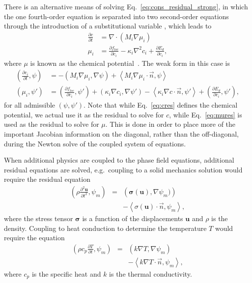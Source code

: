 \documentclass[letter,12pt,fleqn]{article}
\begin{document}
There is an alternative means of solving Eq.~\eqref{eq:cons_residual_strong}, in which the one fourth-order equation is separated into two second-order equations through the introduction of a substitutional variable \citep{Elliott1989}, which leads to
%
\begin{align}
  \nonumber
  \frac{\partial c}{\partial t} &=\nabla \cdot (M_i \nabla \mu_i) \\
  \label{split}
  \mu_i &=  \frac{\partial f_{loc}}{\partial c_i} - \kappa_i \nabla^2 c_i + \frac{\partial E_{d}}{\partial c_i},
\end{align}
%
where $\mu$ is known as the chemical potential~\citep{Elliott1989}. The weak form in this case is
%
\begin{align}
  \left(\frac{\partial c_i}{\partial t}, \psi\right) &=-(M_i\nabla\mu_i,\nabla\psi)+ \left\langle M_i\nabla\mu_i\cdot\vec{n},\psi \right\rangle \label{eq:mures}
  \\
  \left(\mu_i,\psi'\right) &= \left( \frac{\partial f_{loc}}{\partial c_i},\psi'\right) + \left( \kappa_i \nabla c_i,\nabla\psi'\right) - \left\langle  \kappa_i \nabla c \cdot\vec{n},\psi' \right\rangle +  \left( \frac{\partial E_d}{\partial c_i},\psi'\right), \label{eq:cres}
\end{align}
%
for all admissible $(\psi, \psi')$.  Note that while Eq.~\eqref{eq:cres} defines the chemical potential, we actual use it as the residual to solve for $c$, while Eq.~\eqref{eq:mures} is used as the residual to solve for $\mu$. This is done in order to place more of the important Jacobian information on the diagonal, rather than the off-diagonal, during the Newton solve of the coupled system of equations.

When additional physics are coupled to the phase field equations, additional residual equations are solved, e.g.\ coupling to a solid mechanics solution would require the residual equation
\begin{eqnarray}
	\left( \rho \frac{\partial^2 \mathbf{u}}{\partial t^2},\psi_m \right) &=& \left(\boldsymbol{\sigma}(\mathbf{u}),\nabla \psi_m)\right) \nonumber \\ 
	&&- \left< \sigma(\mathbf{u}) \cdot \vec{n},\psi_m \right> , \label{eq:solmech_wk}
\end{eqnarray} 
where the stress tensor $\boldsymbol{\sigma}$ is a function of the displacements $\mathbf{u}$ and $\rho$ is the density.  Coupling to heat conduction to determine the temperature $T$ would require the equation
\begin{eqnarray}
	\left(\rho c_p \frac{\partial T}{\partial t}, \psi_m \right) &=& \left(k \nabla T, \nabla \psi_m \right) \nonumber \\ 
	&&- \left<k \nabla T\cdot \vec{n}, \psi_m \right>, \label{eq:htcond_wk}
\end{eqnarray}
where $c_p$ is the specific heat and $k$ is the thermal conductivity.
\end{document}
